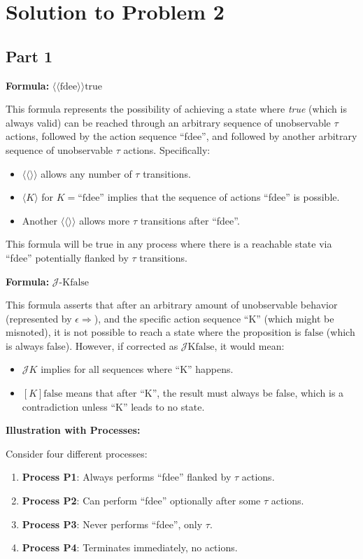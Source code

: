 \documentclass{article}
\begin{document}
\newpage


\section*{Solution to Problem 2}
\subsection{Part 1}


\textbf{Formula:} $\langle\langle\text{fdee}\rangle\rangle \text{true}$

This formula represents the possibility of achieving a state where \textit{true} (which is always valid) can be reached through an arbitrary sequence of unobservable $\tau$ actions, followed by the action sequence ``fdee'', and followed by another arbitrary sequence of unobservable $\tau$ actions. Specifically:
\begin{itemize}
    \item $\langle\langle \rangle\rangle$ allows any number of $\tau$ transitions.
    \item $\langle K \rangle$ for $K = \text{``fdee''}$ implies that the sequence of actions ``fdee'' is possible.
    \item Another $\langle\langle \rangle\rangle$ allows more $\tau$ transitions after ``fdee''.
\end{itemize}
This formula will be true in any process where there is a reachable state via ``fdee'' potentially flanked by $\tau$ transitions.

\textbf{Formula:} $\mathcal{J}\text{-Kfalse}$

This formula asserts that after an arbitrary amount of unobservable behavior (represented by $\epsilon\Rightarrow$), and the specific action sequence ``K'' (which might be misnoted), it is not possible to reach a state where the proposition is $\text{false}$ (which is always false). However, if corrected as $\mathcal{J}\text{Kfalse}$, it would mean:
\begin{itemize}
    \item $\mathcal{J} K$ implies for all sequences where ``K'' happens.
    \item $[K] \text{false}$ means that after ``K'', the result must always be false, which is a contradiction unless ``K'' leads to no state.
\end{itemize}

\textbf{Illustration with Processes:}

Consider four different processes:
\begin{enumerate}
    \item \textbf{Process P1}: Always performs ``fdee'' flanked by $\tau$ actions.
    \item \textbf{Process P2}: Can perform ``fdee'' optionally after some $\tau$ actions.
    \item \textbf{Process P3}: Never performs ``fdee'', only $\tau$.
    \item \textbf{Process P4}: Terminates immediately, no actions.
\end{enumerate}
\end{document}
